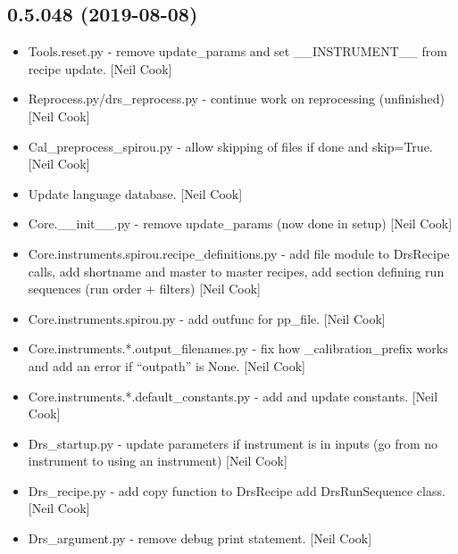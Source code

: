 \documentclass[a4paper,10pt,english]{report}
\begin{document}
\subsection{0.5.048 (2019-08-08)}
\label{\detokenize{misc/changelog:id93}}\begin{itemize}
\item {} 
Tools.reset.py - remove update\_params and set \_\_INSTRUMENT\_\_ from
recipe update. {[}Neil Cook{]}

\item {} 
Reprocess.py/drs\_reprocess.py - continue work on reprocessing
(unfinished) {[}Neil Cook{]}

\item {} 
Cal\_preprocess\_spirou.py - allow skipping of files if done and
\textendash{}skip=True. {[}Neil Cook{]}

\item {} 
Update language database. {[}Neil Cook{]}

\item {} 
Core.\_\_init\_\_.py - remove update\_params (now done in setup) {[}Neil
Cook{]}

\item {} 
Core.instruments.spirou.recipe\_definitions.py - add file module to
DrsRecipe calls, add shortname and master to master recipes, add
section defining run sequences (run order + filters) {[}Neil Cook{]}

\item {} 
Core.instruments.spirou.py - add outfunc for pp\_file. {[}Neil Cook{]}

\item {} 
Core.instruments.*.output\_filenames.py - fix how \_calibration\_prefix
works and add an error if “outpath” is None. {[}Neil Cook{]}

\item {} 
Core.instruments.*.default\_constants.py - add and update constants.
{[}Neil Cook{]}

\item {} 
Drs\_startup.py - update parameters if instrument is in inputs (go from
no instrument to using an instrument) {[}Neil Cook{]}

\item {} 
Drs\_recipe.py - add copy function to DrsRecipe add DrsRunSequence
class. {[}Neil Cook{]}

\item {} 
Drs\_argument.py - remove debug print statement. {[}Neil Cook{]}

\end{itemize}
\end{document}
